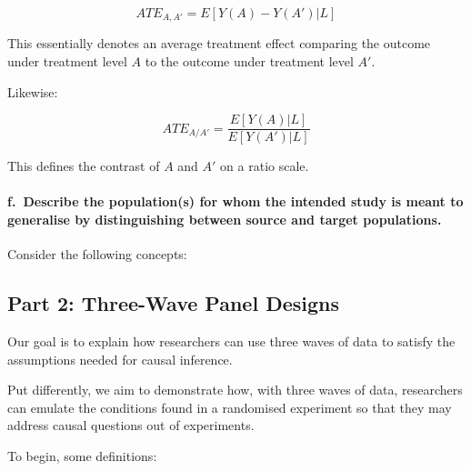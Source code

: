 \documentclass[
  singlecolumn]{article}
\let\oldparagraph\paragraph
\renewcommand{\paragraph}[1]{\oldparagraph{#1}\mbox{}}
\begin{document}
\[ATE_{A,A'} = E[Y(A) - Y(A')| L]\]

This essentially denotes an average treatment effect comparing the
outcome under treatment level \(A\) to the outcome under treatment level
\(A'\).

Likewise:

\[ATE_{A/A'} = \frac{E[Y(A)| L]}{E[Y(A')| L]}\]

This defines the contrast of \(A\) and \(A'\) on a ratio scale.

\paragraph{f.~Describe the population(s) for whom the intended study is
meant to generalise by distinguishing between source and target
populations.}\label{f.-describe-the-populations-for-whom-the-intended-study-is-meant-to-generalise-by-distinguishing-between-source-and-target-populations.}

Consider the following concepts:

\subsection{Part 2: Three-Wave Panel
Designs}\label{part-2-three-wave-panel-designs}

Our goal is to explain how researchers can use three waves of data to
satisfy the assumptions needed for causal inference.

Put differently, we aim to demonstrate how, with three waves of data,
researchers can emulate the conditions found in a randomised experiment
so that they may address causal questions out of experiments.

To begin, some definitions:
\end{document}
